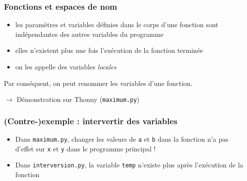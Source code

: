\documentclass{beamer}
\begin{document}
\begin{frame}
  \frametitle{Fonctions et espaces de nom}
  \begin{itemize}
  \item les paramètres et variables définies dans le corps d'une fonction sont \alert{indépendantes} des autres variables du programme
  \item elles n'existent plus une fois l'exécution de la fonction terminée
  \item on les appelle des variables \emph{locales}
\end{itemize}

Par conséquent, on peut renommer les variables d'une fonction.

$\rightarrow{}$ Démonstration sur Thonny (\texttt{maximum.py})

\end{frame}

\begin{frame}
  \frametitle{(Contre-)exemple : intervertir des variables}
  \begin{itemize}
  \item Dans \texttt{maximum.py}, changer les valeurs de \texttt{a} et \texttt{b} dans la fonction \alert{n'a pas d'effet} sur \texttt{x} et \texttt{y} dans le programme principal !
    \item Dans \texttt{interversion.py}, la variable \texttt{temp} \alert{n'existe plus} après l'exécution de la fonction
  \end{itemize}
\end{frame}
\end{document}
